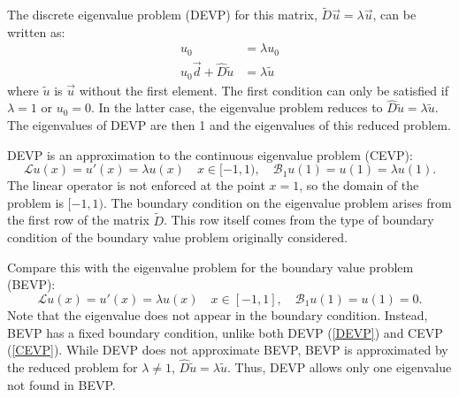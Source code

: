 \documentclass{sfuthesis}
\begin{document}
The discrete eigenvalue problem (DEVP) for this matrix, $\tilde{D} \vec{u} = \lambda \vec{u}$, 
can be written as:
\begin{equation} \label{DEVP}
\begin{aligned}
u_0 & = \lambda u_0 \\ u_0 \vec{d} + \hat{D} \tilde{u} & = \lambda \tilde{u}
\end{aligned}
\end{equation}
where $\tilde{u}$ is $\vec{u}$ without the first element.
The first condition can only be satisfied if $\lambda = 1$ or $u_0 = 0$.
In the latter case, the eigenvalue problem reduces to $\hat{D} \tilde{u} = \lambda \tilde{u}$.
The eigenvalues of DEVP are then 1 and the eigenvalues of this reduced problem.

DEVP is an approximation to the continuous eigenvalue problem (CEVP):
\begin{equation} \label{CEVP}
\mathcal{L} u(x) = u'(x) = \lambda u(x) \quad x \in [-1, 1), \quad \mathcal{B}_1 u(1) = u(1) = \lambda u(1) .
\end{equation}
The linear operator is not enforced at the point $x=1$, so the domain of the problem is $[-1, 1)$.
The boundary condition on the eigenvalue problem arises from the first row of the matrix $\tilde{D}$.
This row itself comes from the type of boundary condition of the boundary value problem originally considered.

Compare this with the eigenvalue problem for the boundary value problem (BEVP):
\begin{equation} \label{BEVP}
\mathcal{L}u(x) = u'(x) = \lambda u(x) \quad x \in [-1,1], \quad \mathcal{B}_1 u(1) = u(1) = 0.
\end{equation}
Note that the eigenvalue does not appear in the boundary condition.
Instead, BEVP has a fixed boundary condition, unlike both DEVP (\ref{DEVP}) and CEVP (\ref{CEVP}).
While DEVP does not approximate BEVP, BEVP is approximated by the reduced problem for $\lambda \neq 1$, $\hat{D} \tilde{u} = \lambda \tilde{u}$.
Thus, DEVP allows only one eigenvalue not found in BEVP.
\end{document}
